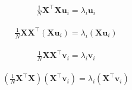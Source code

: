 \documentclass{article}
\begin{document}
\begin{align*}
\frac{1}{N} \mathbf{X}^{\top} \mathbf{X} \mathbf{u}_{i}=\lambda_{i} \mathbf{u}_{i} \tag{16.26}
\end{align*}

\begin{align*}
\frac{1}{N} \mathbf{X} \mathbf{X}^{\top}\left(\mathbf{X} \mathbf{u}_{i}\right)=\lambda_{i}\left(\mathbf{X} \mathbf{u}_{i}\right) \tag{16.27}
\end{align*}

\begin{align*}
\frac{1}{N} \mathbf{X} \mathbf{X}^{\top} \mathbf{v}_{i}=\lambda_{i} \mathbf{v}_{i} \tag{16.28}
\end{align*}

\begin{align*}
\left(\frac{1}{N} \mathbf{X}^{\top} \mathbf{X}\right)\left(\mathbf{X}^{\top} \mathbf{v}_{i}\right)=\lambda_{i}\left(\mathbf{X}^{\top} \mathbf{v}_{i}\right) \tag{16.29}
\end{align*}
\end{document}
